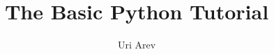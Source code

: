 \documentclass[a4paper,10pt,oneside]{book}
\begin{document}
\title{The Basic Python Tutorial}
\author{Uri Arev}
\date{}
\maketitle
\tableofcontents


\end{document}

